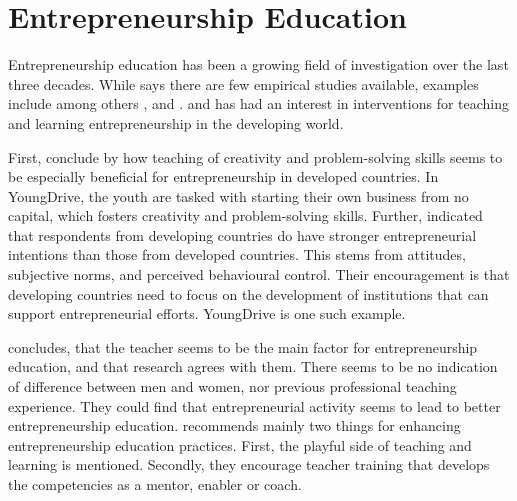 \section{Entrepreneurship Education}\label{entrepreneurship-education}

%

%




Entrepreneurship education has been a growing field of investigation over the last three decades. While \cite{dickson} says there are few empirical studies available, examples include among others \cite{kuratko}, \cite{pittaway} and \cite{bae}. \cite{oviawe} and \cite{iakovleva} has had an interest in interventions for teaching and learning entrepreneurship in the developing world.



First, \cite{oviawe} conclude by how teaching of creativity and problem-solving skills seems to be especially beneficial for entrepreneurship in developed countries. In YoungDrive, the youth are tasked with starting their own business from no capital, which fosters creativity and problem-solving skills. Further, \cite{iakovleva} indicated that respondents from developing countries do have stronger entrepreneurial intentions than those from developed countries. This stems from attitudes, subjective norms, and perceived behavioural control. Their encouragement is that developing countries need to focus on the development of institutions that can support entrepreneurial efforts. YoungDrive is one such example.

\cite{ruskovaara} concludes, that the teacher seems to be the main factor for entrepreneurship education, and that research agrees with them. There seems to be no indication of difference between men and women, nor previous professional teaching experience. They could find that entrepreneurial activity seems to lead to better entrepreneurship education. \cite{dickson} recommends mainly two things for enhancing entrepreneurship education practices. First, the playful side of teaching and learning is mentioned. Secondly, they encourage teacher training that develops the competencies as a mentor, enabler or coach.
